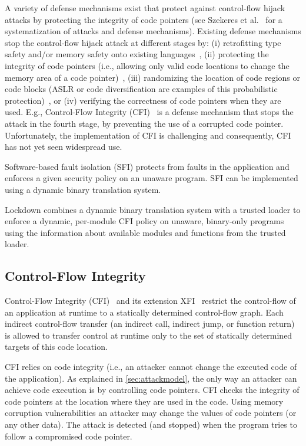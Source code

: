 \documentclass{acm_proc_article-sp}
\begin{document}
A variety of defense mechanisms exist that protect against control-flow hijack
attacks by protecting the integrity of code pointers (see Szekeres et
al.~\cite{szekeres13oakland} for a systematization of attacks and defense
mechanisms). Existing defense mechanisms stop the control-flow hijack attack at
different stages by: (i) retrofitting type safety and/or memory safety onto
existing languages~\cite{necula2005ccured, jim02atc}, (ii) protecting the
integrity of code pointers (i.e., allowing only valid code locations to change
the memory area of a code pointer)~\cite{nagarakatte09pldi, nagarakatte2010ismm,
akritidis08sp}, (iii) randomizing the location of code regions or code blocks
(ASLR or code diversification are examples of this probabilistic
protection)~\cite{aslr, propolice01hiroaki}, or (iv) verifying the correctness
of code pointers when they are used. E.g., Control-Flow Integrity
(CFI)~\cite{ccs05erlingsson} is a defense mechanism that stops the attack in the
fourth stage, by preventing the use of a corrupted code pointer.  Unfortunately,
the implementation of CFI is challenging and consequently, CFI has not yet seen
widespread use. 

Software-based fault isolation (SFI) protects from faults in the application and
enforces a given security policy on an unaware program. SFI can be implemented
using a dynamic binary translation system. 

Lockdown combines a dynamic binary translation system with a trusted loader to
enforce a dynamic, per-module CFI policy on unaware, binary-only programs using
the information about available modules and functions from the trusted loader.


\subsection{Control-Flow Integrity}


Control-Flow Integrity (CFI)~\cite{ccs05erlingsson} and its extension
XFI~\cite{osdi06erlingsson} restrict the control-flow of an application at
runtime to a statically determined control-flow graph. Each indirect
control-flow transfer (an indirect call, indirect jump, or function return) is
allowed to transfer control at runtime only to the set of statically determined
targets of this code location. 

CFI relies on code integrity (i.e., an attacker cannot change the executed code
of the application). As explained in \autoref{sec:attackmodel}, the only way an
attacker can achieve code execution is by controlling code pointers. CFI checks
the integrity of code pointers at the location where they are used in the code.
Using memory corruption vulnerabilities an attacker may change the values of
code pointers (or any other data). The attack is detected (and stopped) when the
program tries to follow a compromised code pointer.
\end{document}
